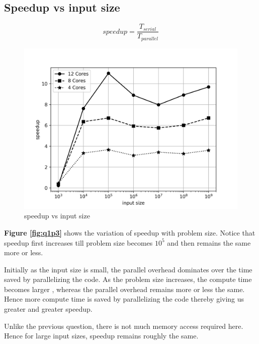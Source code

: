 \documentclass[12,a4paper]{article}
\begin{document}
{    \subsection{Speedup vs input size}
    \begin{equation}
        speedup = \frac{T_{serial}}{T_{parallel}}
    \end{equation}
    \begin{figure}[H]
        \centering
        \includegraphics[width=\textwidth]{pispeedup_size.png}
        \caption{speedup vs input size}
        \label{fig:q1p10}
    \end{figure}
    \textbf{Figure \ref{fig:q1p3}} shows the variation of speedup with problem size. Notice that speedup first increases till problem size becomes $10^5$ and then remains the same more or less.
    
    Initially as the input size is small, the parallel overhead dominates over the time saved by parallelizing the code. As the problem size increases, the compute time becomes larger , whereas the parallel overhead remains more or less the same. Hence more compute time is saved by parallelizing the code thereby giving us greater and greater speedup.
    
    Unlike the previous question, there is not much memory access required here. Hence for large input sizes, speedup remains roughly the same.
    \newpage
}
\end{document}
